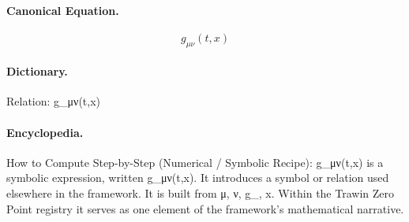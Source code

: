 \paragraph{Canonical Equation.}
\[
g_{\mu\nu}(t,x)
\]

\paragraph{Dictionary.}
Relation: g\_μν(t,x)

\paragraph{Encyclopedia.}
How to Compute Step-by-Step (Numerical / Symbolic Recipe): g\_μν(t,x) is a symbolic expression, written g\_μν(t,x). It introduces a symbol or relation used elsewhere in the framework. It is built from μ, ν, g\_, x. Within the Trawin Zero Point registry it serves as one element of the framework's mathematical narrative.
